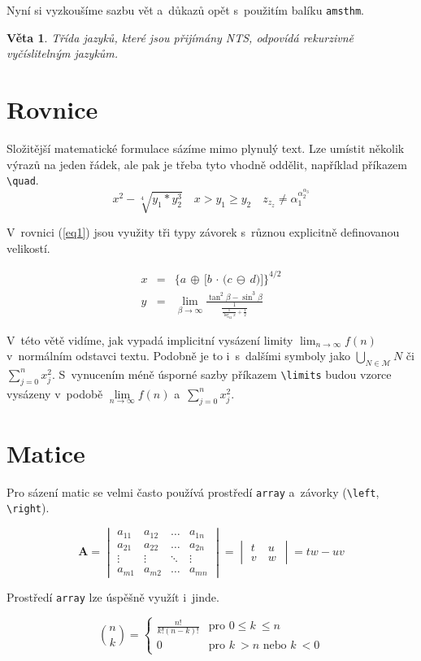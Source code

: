 \documentclass[twocolumn, a4paper, 11pt]{article}
\newtheorem{sentence}{Věta}
\begin{document}
Nyní si vyzkoušíme sazbu vět a~důkazů opět s~použitím balíku \verb|amsthm|.

\begin{sentence}
    Třída jazyků, které jsou přijímány NTS, odpovídá \emph{rekurzivně vyčíslitelným jazykům}.
\end{sentence}

\section{Rovnice}
Složitější matematické formulace sázíme mimo plynulý text. Lze umístit několik výrazů na jeden řádek, ale pak je třeba tyto vhodně oddělit, například příkazem \verb|\quad|.
$$x^2 - \sqrt[4]{y_1 * y_2^3}\quad x > y_1 \geq y_2\quad z_{z_z} \neq \alpha_1^{\alpha_2^{\alpha_3}}$$

V~rovnici (\ref{eq1}) jsou využity tři typy závorek s~různou explicitně definovanou velikostí.

\begin{eqnarray}
    x & = & \bigg\{a\,\oplus\,\Big[b\,\cdot\,\big(c\,\ominus\,d\big)\Big]\bigg\}^{4/2} \label{eq1} \\
    y & = & \lim_{\beta \to \infty} \frac{\tan^2 \beta - \sin^3 \beta}{\frac{1}{\frac{1}{\log_{42} x} + \frac{1}{2}}} \label{eq2}
\end{eqnarray}

V~této větě vidíme, jak vypadá implicitní vysázení limity $\lim_{n \to \infty} f(n)$ v~normálním odstavci textu.
Podobně je to i~s~dalšími symboly jako $\bigcup_{N \in \mathcal{M}} N$ či $\sum_{j = 0}^n x_j^2$.
S~vynucením méně úsporné sazby příkazem \verb|\limits| budou vzorce vysázeny v~podobě $\lim\limits_{n \to \infty} f(n)$ a~$\sum\limits_{j = 0}^n x_j^2$.

\section{Matice}
Pro sázení matic se velmi často používá prostředí \verb|array| a~závorky (\verb|\left|, \verb|\right|).

$$\textbf{A} = \begin{vmatrix} a_{11} & a_{12} & \dots & a_{1n} \\
a_{21} & a_{22} & \dots & a_{2n} \\
\vdots & \vdots & \ddots & \vdots \\
a_{m1} & a_{m2} & \dots & a_{mn} \end{vmatrix} = \begin{vmatrix}
t & u~\\ v~& w \end{vmatrix} = tw - uv$$

Prostředí \verb|array| lze úspěšně využít i~jinde.

$$\binom{n}{k} = \left\{ \begin{array}{ll}
\frac{n!}{k!(n - k)!} & \mbox{pro } 0 \leq k~\leq n \\
0 & \mbox{pro } k~> n \mbox{ nebo } k~< 0
\end{array} \right.$$
\end{document}
